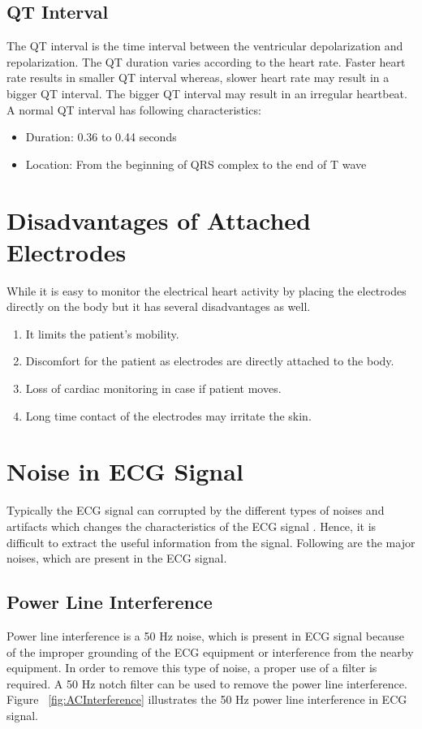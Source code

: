 \subsection{QT Interval}
The QT interval is the time interval between the ventricular depolarization and repolarization. The QT duration varies according to the heart rate. Faster heart rate results in smaller QT interval whereas, slower heart rate may result in a bigger QT interval. The bigger QT interval may result in an irregular heartbeat. A normal QT interval has following characteristics:

\begin{itemize}
	\item Duration: 0.36 to 0.44 seconds
	\item Location: From the beginning of QRS complex to the end of T wave
\end{itemize}

\section{Disadvantages of Attached Electrodes} \label{electrodes_disadv}

While it is easy to monitor the electrical heart activity by placing the electrodes directly on the body but it has several disadvantages as well.

\begin{enumerate}
	\item It limits the patient's mobility.
	\item Discomfort for the patient as electrodes are directly attached to the body.
	\item Loss of cardiac monitoring in case if patient moves.
	\item Long time contact of the electrodes may irritate the skin.
\end{enumerate}

\section{Noise in ECG Signal}
Typically the ECG signal can  corrupted by the different types of noises and artifacts which changes the characteristics of the ECG signal \cite{limaye2016ecg}. Hence, it is difficult to extract the useful information from the signal. Following are the major noises, which are present in the ECG signal.

\subsection{Power Line Interference}
Power line interference is a 50 Hz noise, which is present in ECG signal because of the improper grounding of the ECG equipment or interference from the nearby equipment. In order to remove this type of noise, a proper use of a filter is required. A 50 Hz notch filter can be used to remove the power line interference. Figure ~\ref{fig:ACInterference} illustrates the 50 Hz power line interference in ECG signal.


